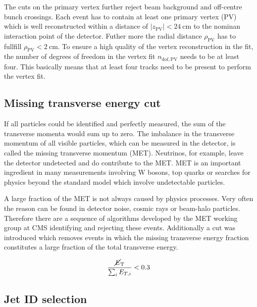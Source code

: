 The cuts on the primary vertex further reject beam background and off-centre bunch
crossings. Each event has to contain at least one primary vertex (PV) which is well
reconstructed within a distance of $|z_\mathrm{PV}| < \SI{24}{\centi \meter}$ to
the nominan interaction point of the detector. Futher more the radial distance
$\rho_\mathrm{PV}$ has to fullfill $\rho_\mathrm{PV} < \SI{2}{\centi\meter}$. To
ensure a high quality of the vertex reconstruction in the fit, the number of
degrees of freedom in the vertex fit $n_{\mathrm{dof,PV}}$ needs to be at least
four. This basically means that at least four tracks need to be present to
perform the vertex fit.

\subsection{Missing transverse energy cut}

If all particles could be identified and perfectly measured, the sum of the
transverse momenta would sum up to zero. The imbalance in the transverse
momentum of all visible particles, which can be measured in the detector, is
called the missing transverse momentum (MET). Neutrinos, for example, leave the
detector undetected and do contribute to the MET. MET is an important ingredient
in many measurements involving W bosons, top quarks or searches for physics
beyond the standard model which involve undetectable particles. 

A large fraction of the MET is not always caused by physics processes. Very
often the reason can be found in detector noise, cosmic rays or beam-halo
particles. Therefore there are a sequence of algorithms developed by the MET
working group at CMS identifying and rejecting these events. Additionally a cut
was introduced which removes events in which the missing transverse energy
fraction \met constitutes a large fraction of the total transverse energy.

\begin{equation}
    \frac{\cancel{E}_{\mathrm{T}}}{\sum_i E_{T,i}} < 0.3
\end{equation}

\subsection{Jet ID selection}

